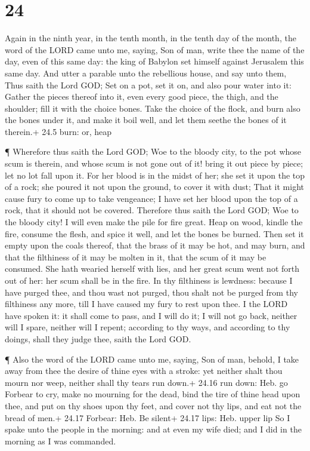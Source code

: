 \hypertarget{section-23}{%
\section{24}\label{section-23}}

 Again in the ninth year, in the tenth month, in the tenth
day of the month, the word of the LORD came unto me, saying,
 Son of man, write thee the name of the day, even of this
same day: the king of Babylon set himself against Jerusalem this same
day.  And utter a parable unto the rebellious house, and say
unto them, Thus saith the Lord GOD; Set on a pot, set it on, and also
pour water into it:  Gather the pieces thereof into it, even
every good piece, the thigh, and the shoulder; fill it with the choice
bones.  Take the choice of the flock, and burn also the
bones under it, and make it boil well, and let them seethe the bones of
it therein.+ 24.5 burn: or, heap

 ¶ Wherefore thus saith the Lord GOD; Woe to the bloody
city, to the pot whose scum is therein, and whose scum is not gone out
of it! bring it out piece by piece; let no lot fall upon it.
 For her blood is in the midst of her; she set it upon the
top of a rock; she poured it not upon the ground, to cover it with dust;
 That it might cause fury to come up to take vengeance; I
have set her blood upon the top of a rock, that it should not be
covered.  Therefore thus saith the Lord GOD; Woe to the
bloody city! I will even make the pile for fire great. 
Heap on wood, kindle the fire, consume the flesh, and spice it well, and
let the bones be burned.  Then set it empty upon the coals
thereof, that the brass of it may be hot, and may burn, and that the
filthiness of it may be molten in it, that the scum of it may be
consumed.  She hath wearied herself with lies, and her
great scum went not forth out of her: her scum shall be in the fire.
 In thy filthiness is lewdness: because I have purged thee,
and thou wast not purged, thou shalt not be purged from thy filthiness
any more, till I have caused my fury to rest upon thee.  I
the LORD have spoken it: it shall come to pass, and I will do it; I will
not go back, neither will I spare, neither will I repent; according to
thy ways, and according to thy doings, shall they judge thee, saith the
Lord GOD.

 ¶ Also the word of the LORD came unto me, saying,
 Son of man, behold, I take away from thee the desire of
thine eyes with a stroke: yet neither shalt thou mourn nor weep, neither
shall thy tears run down.+ 24.16 run down: Heb. go  Forbear
to cry, make no mourning for the dead, bind the tire of thine head upon
thee, and put on thy shoes upon thy feet, and cover not thy lips, and
eat not the bread of men.+ 24.17 Forbear: Heb. Be silent+ 24.17 lips:
Heb. upper lip  So I spake unto the people in the morning:
and at even my wife died; and I did in the morning as I was commanded.

